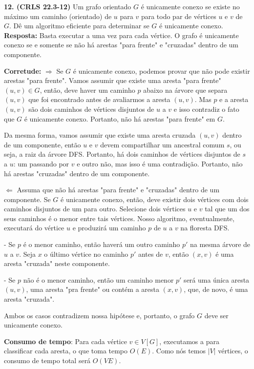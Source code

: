 
\noindent\textbf{12. (CRLS 22.3-12)} Um grafo orientado $G$ é unicamente conexo se existe no máximo um caminho (orientado) de $u$ para $v$ para todo par de vértices $u$ e $v$ de $G$. Dê um algoritmo eficiente para determinar se $G$ é unicamente conexo.\\[6pt]
\textbf{Resposta:} Basta executar a  uma vez para cada vértice. O grafo é unicamente conexo se e somente se não há arestas "para frente" e "cruzadas" dentro de um componente.

\textbf{Corretude:} $\Rightarrow$ Se $G$ é unicamente conexo, podemos provar que não pode existir arestas "para frente". Vamos assumir que existe uma aresta "para frente" $(u, v) \in G$, então, deve haver um caminho $p$ abaixo na árvore que separa $(u, v)$ que foi encontrado antes de avaliarmos a aresta $(u, v)$. Mas $p$ e a aresta $(u, v)$ são dois caminhos de vértices disjuntos de $u$ a $v$ e isso contradiz o fato que $G$ é unicamente conexo. Portanto, não há arestas "para frente" em $G$.

Da mesma forma, vamos assumir que existe uma aresta cruzada $(u, v)$ dentro de um componente, então $u$ e $v$ devem compartilhar um ancestral comum $s$, ou seja, a raiz da árvore DFS. Portanto, há dois caminhos de vértices disjuntos de $s$ a $u$: um passando por $v$ e outro não, mas isso é uma contradição. Portanto, não há arestas "cruzadas" dentro de um componente.

$\Leftarrow$ Assuma que não há arestas "para frente" e "cruzadas" dentro de um componente. Se $G$ é unicamente conexo, então, deve existir dois vértices com dois caminhos disjuntos de um para outro. Selecione dois vértices $u$ e $v$ tal que um dos seus caminhos é o menor entre tais vértices. Nosso algoritmo, eventualmente, executará do vértice $u$ e produzirá um caminho $p$ de $u$ a $v$ na floresta DFS.

- Se $p$ é o menor caminho, então haverá um outro caminho $p'$ na mesma árvore de $u$ a $v$. Seja $x$ o último vértice no caminho $p'$ antes de $v$, então $(x, v)$ é uma aresta "cruzada" neste componente.

- Se $p$ não é o menor caminho, então um caminho menor $p'$ será uma única aresta $(u, v)$, uma aresta "pra frente" ou contém a aresta $(x, v)$, que, de novo, é uma aresta "cruzada".

Ambos os casos contradizem nossa hipótese e, portanto, o grafo $G$ deve ser unicamente conexo.

\textbf{Consumo de tempo}: Para cada vértice $v \in V[G]$, executamos a  para classificar cada aresta, o que toma tempo $O(E)$. Como nós temos $|V|$ vértices, o consumo de tempo total será $O(VE)$.\\[6pt]